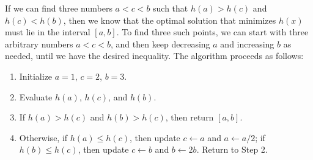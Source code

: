 \documentclass[11pt,a4paper]{article}
\begin{document}


If we can find three numbers $a < c < b$ such that $h(a) > h(c)$ and $h(c) < h(b)$, then we know that the optimal solution that minimizes $h(x)$ must lie in the interval $[a,b]$.
To find three such points, we can start with three arbitrary numbers $a < c < b$, and then keep decreasing $a$ and increasing $b$ as needed, until we have the desired inequality.
The algorithm proceeds as follows:
\begin{enumerate}
    \item Initialize $a=1$, $c = 2$, $b=3$.
    \item Evaluate $h(a)$, $h(c)$, and $h(b)$. 
    \item If $h(a) > h(c)$ and $h(b) > h(c)$, then return $[a,b]$.     
    \item Otherwise, if $h(a) \leq h(c)$, then update $c \leftarrow a$ and $a \leftarrow a/2$; if $h(b) \leq h(c)$, then update $c \leftarrow b$ and $b \leftarrow 2 b$. Return to Step 2.
\end{enumerate}

\end{document}
